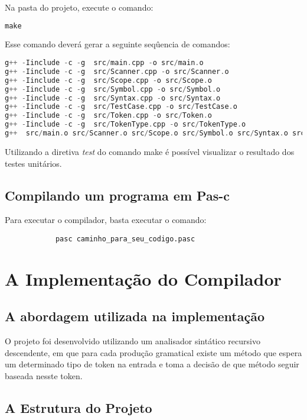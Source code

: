 \documentclass[11pt]{article}
\begin{document}
		Na pasta do projeto, execute o comando:
\begin{lstlisting}[language=C++]
make
\end{lstlisting} 
		
		Esse comando deverá gerar a seguinte seqûencia de comandos:
\begin{lstlisting}[language=C++]
g++ -Iinclude -c -g  src/main.cpp -o src/main.o
g++ -Iinclude -c -g  src/Scanner.cpp -o src/Scanner.o
g++ -Iinclude -c -g  src/Scope.cpp -o src/Scope.o
g++ -Iinclude -c -g  src/Symbol.cpp -o src/Symbol.o
g++ -Iinclude -c -g  src/Syntax.cpp -o src/Syntax.o
g++ -Iinclude -c -g  src/TestCase.cpp -o src/TestCase.o
g++ -Iinclude -c -g  src/Token.cpp -o src/Token.o
g++ -Iinclude -c -g  src/TokenType.cpp -o src/TokenType.o
g++  src/main.o src/Scanner.o src/Scope.o src/Symbol.o src/Syntax.o src/TestCase.o src/Token.o src/TokenType.o -o pasc
\end{lstlisting}

	Utilizando a diretiva \textit{test} do comando make é possível visualizar o resultado dos testes unitários.
	
	\subsection{Compilando um programa em Pas-c}
	
		Para executar o compilador, basta executar o comando:
		
		\begin{verbatim}
			pasc caminho_para_seu_codigo.pasc
		\end{verbatim}
	

\newpage
\section{A Implementação do Compilador}
	
	\subsection{A abordagem utilizada na implementação}
		
		O projeto foi desenvolvido utilizando um analisador sintático recursivo descendente,
		em que para cada produção gramatical existe um método que espera um determinado tipo de 
		token na entrada e toma a decisão de que método seguir baseada nesste token.
		
	\subsection{A Estrutura do Projeto}
		
\end{document}

